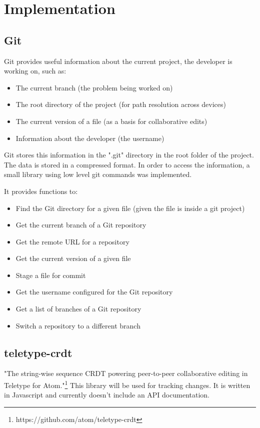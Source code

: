\chapter{Implementation}

\section{Git}

Git provides useful information about the current project, the developer is working on, such as:
\begin{itemize}
    \item The current branch (the problem being worked on)
    \item The root directory of the project (for path resolution across devices)
    \item The current version of a file (as a basis for collaborative edits)
    \item Information about the developer (the username)
\end{itemize}

Git stores this information in the ".git" directory in the root folder of the project.
The data is stored in a compressed format. In order to access the information, a small library using low level git commands was implemented. 

It provides functions to:
\begin{itemize}
    \item Find the Git directory for a given file (given the file is inside a git project)
    \item Get the current branch of a Git repository
    \item Get the remote URL for a repository
    \item Get the current version of a given file
    \item Stage a file for commit
    \item Get the username configured for the Git repository
    \item Get a list of branches of a Git repository
    \item Switch a repository to a different branch
\end{itemize}

\section{teletype-crdt}

"The string-wise sequence CRDT powering peer-to-peer collaborative editing in Teletype for Atom."\footnote{https://github.com/atom/teletype-crdt}
This library will be used for tracking changes. It is written in Javascript and currently doesn't include an API documentation.


